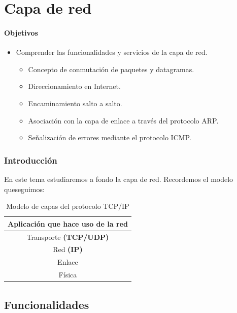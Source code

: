 \chapter{Capa de red}

\subsubsection{Objetivos}

\begin{itemize}
    \item Comprender las funcionalidades y servicios de la capa de red.
        \begin{itemize}
            \item Concepto de conmutación de paquetes y datagramas. 
            \item Direccionamiento en Internet.
            \item Encaminamiento salto a salto.
            \item Asociación con la capa de enlace a través del protocolo ARP\@.
            \item Señalización de errores mediante el protocolo ICMP\@.
        \end{itemize}
\end{itemize}

\subsection{Introducción}

En este tema estudiaremos a fondo la capa de red. Recordemos el modelo queseguimos: 

\begin{table}[h]
    \centering
    \begin{tabular}{|c|}
        \hline
        Aplicación que hace uso de la red\\ \hline
        Transporte \textbf{(TCP/UDP)} \\ \hline
        Red \textbf{(IP)} \\ \hline
        Enlace \\ \hline
        Física \\ \hline
    \end{tabular}
    \caption{Modelo de capas del protocolo TCP/IP}
    \label{table:_tabla_de_capas}
\end{table}



\section{Funcionalidades}


